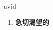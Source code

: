 
\begin{frame}
{\huge avid}
\begin{center}
\begin{enumerate}\Large
  \item \textbf{急切渴望的}
\end{enumerate}
\end{center}
\end{frame}
